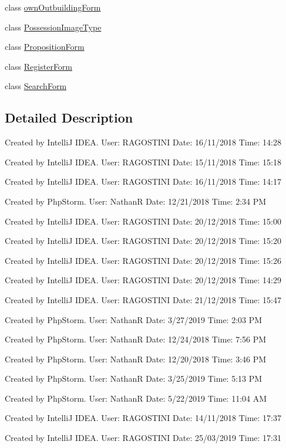 \begin{DoxyCompactItemize}
\item 
class \mbox{\hyperlink{class_app_1_1_forms_1_1own_outbuilding_form}{own\+Outbuilding\+Form}}
\item 
class \mbox{\hyperlink{class_app_1_1_forms_1_1_possession_image_type}{Possession\+Image\+Type}}
\item 
class \mbox{\hyperlink{class_app_1_1_forms_1_1_proposition_form}{Proposition\+Form}}
\item 
class \mbox{\hyperlink{class_app_1_1_forms_1_1_register_form}{Register\+Form}}
\item 
class \mbox{\hyperlink{class_app_1_1_forms_1_1_search_form}{Search\+Form}}
\end{DoxyCompactItemize}


\subsection{Detailed Description}
Created by IntelliJ I\+D\+EA. User\+: R\+A\+G\+O\+S\+T\+I\+NI Date\+: 16/11/2018 Time\+: 14\+:28

Created by IntelliJ I\+D\+EA. User\+: R\+A\+G\+O\+S\+T\+I\+NI Date\+: 15/11/2018 Time\+: 15\+:18

Created by IntelliJ I\+D\+EA. User\+: R\+A\+G\+O\+S\+T\+I\+NI Date\+: 16/11/2018 Time\+: 14\+:17

Created by Php\+Storm. User\+: NathanR Date\+: 12/21/2018 Time\+: 2\+:34 PM

Created by IntelliJ I\+D\+EA. User\+: R\+A\+G\+O\+S\+T\+I\+NI Date\+: 20/12/2018 Time\+: 15\+:00

Created by IntelliJ I\+D\+EA. User\+: R\+A\+G\+O\+S\+T\+I\+NI Date\+: 20/12/2018 Time\+: 15\+:20

Created by IntelliJ I\+D\+EA. User\+: R\+A\+G\+O\+S\+T\+I\+NI Date\+: 20/12/2018 Time\+: 15\+:26

Created by IntelliJ I\+D\+EA. User\+: R\+A\+G\+O\+S\+T\+I\+NI Date\+: 20/12/2018 Time\+: 14\+:29

Created by IntelliJ I\+D\+EA. User\+: R\+A\+G\+O\+S\+T\+I\+NI Date\+: 21/12/2018 Time\+: 15\+:47

Created by Php\+Storm. User\+: NathanR Date\+: 3/27/2019 Time\+: 2\+:03 PM

Created by Php\+Storm. User\+: NathanR Date\+: 12/24/2018 Time\+: 7\+:56 PM

Created by Php\+Storm. User\+: NathanR Date\+: 12/20/2018 Time\+: 3\+:46 PM

Created by Php\+Storm. User\+: NathanR Date\+: 3/25/2019 Time\+: 5\+:13 PM

Created by Php\+Storm. User\+: NathanR Date\+: 5/22/2019 Time\+: 11\+:04 AM

Created by IntelliJ I\+D\+EA. User\+: R\+A\+G\+O\+S\+T\+I\+NI Date\+: 14/11/2018 Time\+: 17\+:37

Created by IntelliJ I\+D\+EA. User\+: R\+A\+G\+O\+S\+T\+I\+NI Date\+: 25/03/2019 Time\+: 17\+:31 